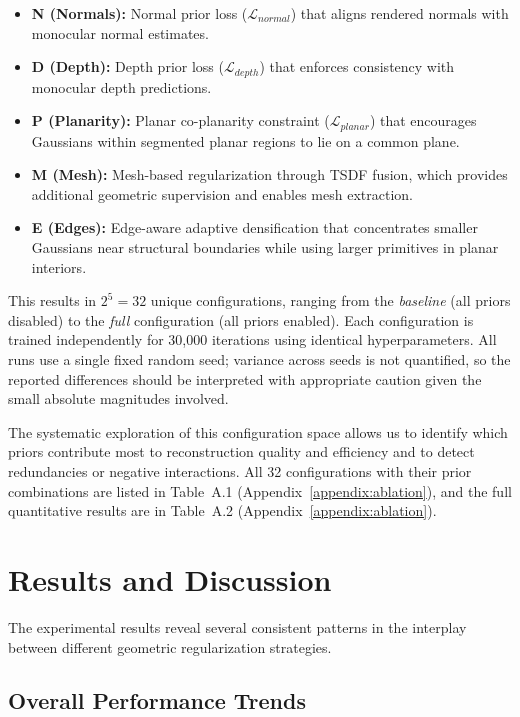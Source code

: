 \begin{itemize}
    \item \textbf{N (Normals):} Normal prior loss ($\mathcal{L}_{normal}$) that aligns rendered normals with monocular normal estimates.
    \item \textbf{D (Depth):} Depth prior loss ($\mathcal{L}_{depth}$) that enforces consistency with monocular depth predictions.
    \item \textbf{P (Planarity):} Planar co-planarity constraint ($\mathcal{L}_{planar}$) that encourages Gaussians within segmented planar regions to lie on a common plane.
    \item \textbf{M (Mesh):} Mesh-based regularization through TSDF fusion, which provides additional geometric supervision and enables mesh extraction.
    \item \textbf{E (Edges):} Edge-aware adaptive densification that concentrates smaller Gaussians near structural boundaries while using larger primitives in planar interiors.
\end{itemize}

This results in $2^5 = 32$ unique configurations, ranging from the \textit{baseline} (all priors disabled) to the \textit{full} configuration (all priors enabled). Each configuration is trained independently for 30,000 iterations using identical hyperparameters. All runs use a single fixed random seed; variance across seeds is not quantified, so the reported differences should be interpreted with appropriate caution given the small absolute magnitudes involved.

The systematic exploration of this configuration space allows us to identify which priors contribute most to reconstruction quality and efficiency and to detect redundancies or negative interactions. All 32 configurations with their prior combinations are listed in Table~A.1 (Appendix~\ref{appendix:ablation}), and the full quantitative results are in Table~A.2 (Appendix~\ref{appendix:ablation}).

\section{Results and Discussion}

The experimental results reveal several consistent patterns in the interplay between different geometric regularization strategies.

\subsection{Overall Performance Trends}

